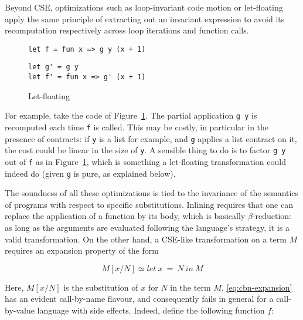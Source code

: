 \documentclass[sigplan,10pt,review,anonymous]{acmart}
\begin{document}
Beyond CSE, optimizations such as loop-invariant code motion or
let-floating~\cite{letFloating} apply the same principle of extracting out an invariant
expression to avoid its recomputation respectively across loop iterations and
function calls.

\begin{figure}
  \begin{center}
\begin{lstlisting}[language=nickel,title={Source program}]
let f = fun x => g y (x + 1)
\end{lstlisting}
\begin{lstlisting}[language=nickel,title={Optimized program}]
let g' = g y
let f' = fun x => g' (x + 1)
\end{lstlisting}
  \end{center}
\caption{Let-floating}
\label{fig:optimizations-let-floating-ex}
\end{figure}

For example, take the code of Figure~\ref{fig:optimizations-let-floating-ex}.
The partial application \lstinline+g y+ is recomputed each time \lstinline+f+ is
called. This may be costly, in particular in the presence of contracts: if
\lstinline+y+ is a list for example, and \lstinline+g+ applies a list contract
on it, the cost could be linear in the size of \lstinline+y+. A sensible thing
to do is to factor \lstinline+g y+ out of \lstinline+f+ as in
Figure~\ref{fig:optimizations-let-floating-ex}, which is something a
let-floating transformation could indeed do (given \lstinline+g+ is pure, as
explained below).

The soundness of all these optimizations is tied to the invariance of the
semantics of programs with respect to specific substitutions. Inlining requires
that one can replace the application of a function by its body, which is
basically $\beta$-reduction: as long as the arguments are evaluated following
the language's strategy, it is a valid transformation. On the other hand,
a CSE-like transformation on a term $M$ requires an expansion property of the form

\begin{equation}\label{eq:cbn-expansion}
M[x/N] \simeq let~x~=~N~in~M
\end{equation}

Here, $M[x/N]$ is the substitution of $x$ for $N$ in the term $M$.
\ref{eq:cbn-expansion} has an evident call-by-name flavour, and consequently
fails in general for a call-by-value language with side effects.  Indeed, define
the following function $f$:
\end{document}
